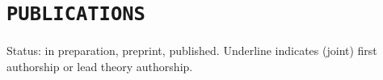 \documentclass[11pt,a4paper,sans]{moderncv}        %
\newcommand\colourhref[3][color2]{\href{#2}{\color{#1}#3}}
\begin{document}
\section{\texttt{PUBLICATIONS}}
Status: {\color{darkgray} in preparation}, {\color{OliveGreen} preprint}, {published}.
Underline indicates (joint) first authorship or lead theory authorship.
\nocite{*}
{\color{darkgray}\printbibliography[heading=none,keyword=inprep]}
\vspace{-0.25in}
\nocite{*}
{\color{OliveGreen}\printbibliography[heading=none,keyword=preprint]}
\vspace{-0.25in}
\printbibliography[heading=none,keyword=final]

\end{document}
